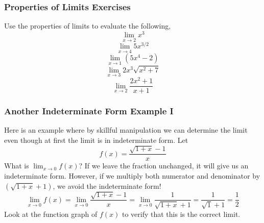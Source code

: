 \documentclass[xcolor=dvipsnames]{beamer}
\begin{document}
\begin{frame}
  \frametitle{Properties of Limits Exercises}
Use the properties of limits to evaluate the following,
\begin{equation}
  \label{eq:eemoopha}
 \lim_{x\rightarrow{}2}x^{3} 
\end{equation}
\begin{equation}
  \label{eq:queebaet}
 \lim_{x\rightarrow{}4}5x^{3/2} 
\end{equation}
\begin{equation}
  \label{eq:xoquaenu}
 \lim_{x\rightarrow{}1}\left(5x^{4} -2\right)
\end{equation}
\begin{equation}
  \label{eq:othahzau}
 \lim_{x\rightarrow{}3}2x^{3}\sqrt{x^{2}+7}
\end{equation}
\begin{equation}
  \label{eq:ayaivoma}
 \lim_{x\rightarrow{}2}\frac{2x^{2}+1}{x+1}
\end{equation}
\end{frame}

\begin{frame}
  \frametitle{Another Indeterminate Form Example I}
  Here is an example where by skillful manipulation we can determine
  the limit even though at first the limit is in indeterminate form.
  Let
\begin{equation}
  \label{eq:xierigai}
  f(x)=\frac{\sqrt{1+x}-1}{x}
\end{equation}
What is $\lim_{x\rightarrow{}0}f(x)$? If we leave the fraction
unchanged, it will give us an indeterminate form. However, if we
multiply both numerator and denominator by $(\sqrt{1+x}+1)$, we avoid
the indeterminate form!
\begin{equation}
  \label{eq:ciabohmi}
  \lim_{x\rightarrow{}0}f(x)=\lim_{x\rightarrow{}0}\frac{\sqrt{1+x}-1}{x}=\lim_{x\rightarrow{}0}\frac{1}{\sqrt{1+x}+1}=\frac{1}{\sqrt{1}+1}=\frac{1}{2}
\end{equation}
Look at the function graph of $f(x)$ to verify that this is the
correct limit.
\end{frame}
\end{document}
